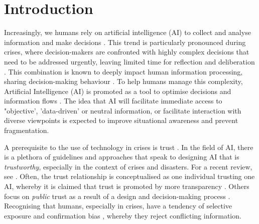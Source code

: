 \documentclass[pdflatex,sn-apa]{sn-jnl}%
\begin{document}



\maketitle

\section{Introduction}\label{sec1}
Increasingly, we humans rely on artificial intelligence (AI) to collect and analyse information and make decisions \citep{klingbeil2024trust}. This trend is particularly pronounced during crises, where decision-makers are confronted with highly complex decisions that need to be addressed urgently, leaving limited time for reflection and deliberation \citep{mendonca2001decision}. This combination is known to deeply impact human information processing, sharing decision-making behaviour \citep{comes2020coordination}. To help humans manage this complexity, Artificial Intelligence (AI) is promoted as a tool to optimise decisions and information flows \citep{jeon2024hearhere}. The idea that AI will facilitate immediate access to "objective', 'data-driven' or neutral information, or facilitate interaction with diverse viewpoints is expected to improve situational awareness and prevent fragmentation. 

A prerequisite to the use of technology in crises is trust \citep{steinbrink2024impact}. In the field of AI, there is a plethora of guidelines and approaches that speak to designing AI that is \textit{trustworthy}, especially in the context of crises and disasters. For a recent review, see \citep{albahri2024systematic}. Often, the trust relationship is conceptualised as one individual trusting one AI, whereby it is claimed that trust is promoted by more transparency \citep{visave2025transparency}. Others focus on \textit{public} trust as a result of a design and decision-making process \citep{tzachor2020artificial}. Recognising that humans, especially in crises, have a tendency of selective exposure \citep{barbera2015tweeting} and confirmation bias \citep{paulus2024interplay}, whereby they reject conflicting information. 
\end{document}
